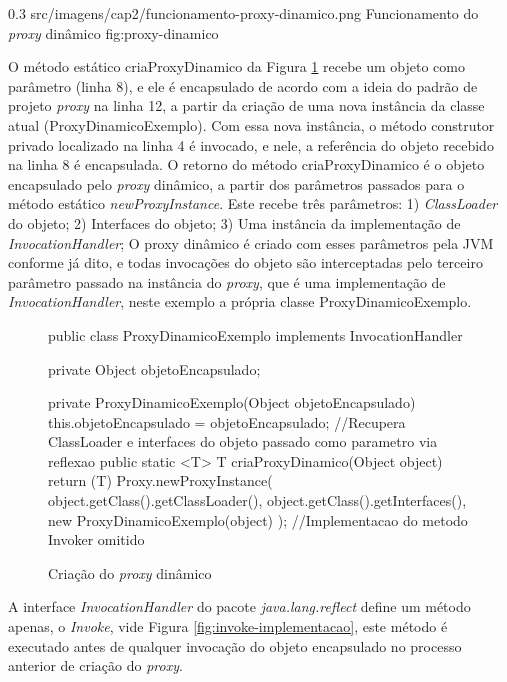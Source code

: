 \begin{image}
{0.3} %
{src/imagens/cap2/funcionamento-proxy-dinamico.png} %
{Funcionamento do \textit{proxy} dinâmico} %
{fig:proxy-dinamico} %
{\cite{guerra2014componentes}} %
\end{image}

\par O método estático criaProxyDinamico da Figura \ref{fig:cria-proxy-dinamico} recebe um objeto como parâmetro (linha 8), e ele é encapsulado de acordo com a ideia do padrão de projeto \textit{proxy} na linha 12, a partir da criação de uma nova instância da classe atual (ProxyDinamicoExemplo). Com essa nova instância, o método construtor privado localizado na linha 4 é invocado, e nele, a referência do objeto recebido na linha 8 é encapsulada. O retorno do método criaProxyDinamico é o objeto encapsulado pelo \textit{proxy} dinâmico, a partir dos parâmetros passados para o método estático \textit{newProxyInstance}. Este recebe três parâmetros: 1) \textit{ClassLoader} do objeto; 2) Interfaces do objeto; 3) Uma instância da implementação de \textit{InvocationHandler}; O proxy dinâmico é criado com esses parâmetros pela JVM conforme já dito, e todas invocações do objeto são interceptadas pelo terceiro parâmetro passado na instância do \textit{proxy}, que é uma implementação de \textit{InvocationHandler}, neste exemplo a própria classe ProxyDinamicoExemplo.

\begin{figure}[H]
    \centering
    \caption{Criação do \textit{proxy} dinâmico}
    \label{fig:cria-proxy-dinamico}
    \begin{java}
public class ProxyDinamicoExemplo implements InvocationHandler {
    	private Object objetoEncapsulado;

	private ProxyDinamicoExemplo(Object objetoEncapsulado) {
		this.objetoEncapsulado = objetoEncapsulado;
	}
//Recupera ClassLoader e interfaces do objeto passado como parametro via reflexao
	public static <T> T criaProxyDinamico(Object object) {
		return (T) Proxy.newProxyInstance(
        		object.getClass().getClassLoader(),
        		object.getClass().getInterfaces(),
        		new ProxyDinamicoExemplo(object)
		);
	}
//Implementacao do metodo Invoker omitido
}
    \end{java}
\end{figure}


\par A interface \textit{InvocationHandler} do pacote \textit{java.lang.reflect} define um método apenas, o \textit{Invoke}, vide Figura \ref{fig:invoke-implementacao}, este método é executado antes de qualquer invocação do objeto encapsulado no processo anterior de criação do \textit{proxy}.

